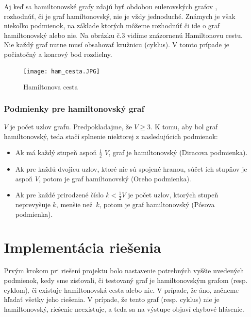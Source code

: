 \documentclass[a4paper,11pt, titlepage]{article}
\begin{document}
\par
Aj keď sa hamiltonovské grafy zdajú byť obdobou eulerovských grafov \cite{SFU}, rozhodnúť, či je graf hamiltonovský, nie je vždy jednoduché. Známych je však niekoľko podmienok, na základe ktorých môžeme rozhodnúť či ide o graf hamiltonovský alebo nie.
Na obrázku č.3 vidíme znázornenú Hamiltonovu cestu. Nie každý graf nutne musí obsahovať kružnicu (cyklus). V tomto prípade je počiatočný a koncový bod rozdielny.

\begin{figure}[h]
\centering
\texttt{[image: ham\_cesta.JPG]}
\caption{Hamiltonova cesta}
\label{Obr. 3}
\end{figure}

\subsubsection{Podmienky pre hamiltonovský graf}
\par
$V$ je počet uzlov grafu. Predpokladajme, že $V \geq 3$. K tomu, aby bol graf hamiltonovský, teda stačí splnenie niektorej z nasledujúcich podmienok:

\begin{itemize}[noitemsep]
	\item Ak má každý stupeň aspoň \(\frac{1}{2}\) $V$, graf je hamiltonovský (Diracova podmienka).\vspace{0.25cm}
	\item Ak pre každú dvojicu uzlov, ktoré nie sú spojené hranou, súčet ich stupňov je aspoň $V$, potom je graf hamiltonovský (Oreho podmienka). \vspace{0.25cm}
	\item Ak pre každé prirodzené číslo $k < \frac{1}{2} V$ je počet uzlov, ktorých stupeň neprevyšuje $k$, menšie než~$k$, potom je graf hamiltonovský (Pósova podmienka).
\end{itemize}

\section{Implementácia riešenia}

Prvým krokom pri riešení projektu bolo nastavenie potrebných vyššie uvedených podmienok, kedy sme zisťovali, či testovaný graf je hamiltonovským grafom (resp. cyklom), či existuje hamiltonovská cesta alebo nie. V prípade, že áno, začneme hľadať všetky jeho riešenia. V prípade, že tento graf (resp. cyklus) nie je hamiltonovský, riešenie neexistuje, a teda sa na výstupe objaví chybové hlásenie.
\end{document}
